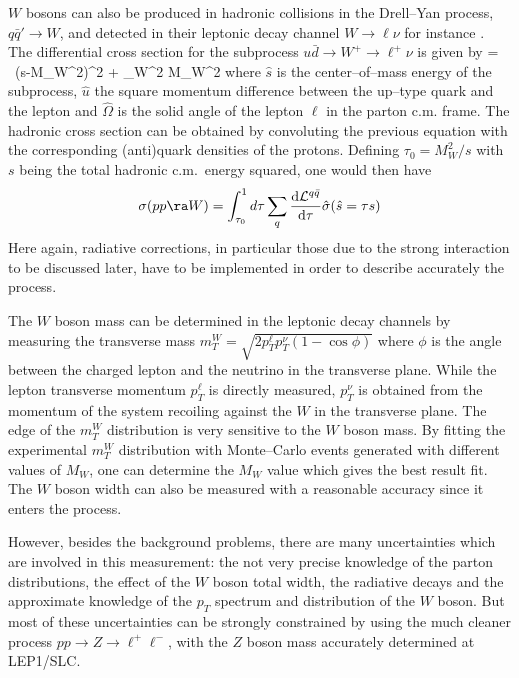 $W$ bosons can also be produced in hadronic collisions in the Drell--Yan
process, $q \bar{q}' \to W$, and detected  in their leptonic decay channel 
$W \to \ell \nu$ for instance \cite{MW-Tevatron-rev,EW-LHC}. The differential 
cross section for the subprocess $u \bar{d} \to W^+ \to \ell^+ \nu$ is  given by
\cite{Drell-Yan}
\beq
{} =
 \,  \, 
{ (\hat s-M_W^2)^2 + \Gamma_W^2 M_W^2} 
\eeq
where   $\hat{s}$ is the center--of--mass energy of the subprocess, $\hat{u}$
the square momentum difference between the up--type quark and the lepton 
and $\hat{\Omega}$ is the solid angle of the lepton $\ell$ in the parton
c.m. frame. The hadronic cross section can be obtained by convoluting the 
previous equation with the corresponding (anti)quark densities of the protons.  
Defining $\tau_0=M_W^2/s$  with $s$ being the total hadronic c.m.~energy 
squared, one would then have
\begin{eqnarray}
\sigma (pp \ra W) = \int_{\tau_0}^1 d\tau 
\sum_q \frac{{\rm d} {\cal L}^{q\bar q}}{{\rm d} \tau} \hat\sigma (\hat{s}
=\tau s)  
\end{eqnarray}
Here again, radiative corrections, in particular those due to the strong
interaction \cite{DYNLO,DYNNLO} to be discussed later, have to be implemented 
in order to describe accurately the process. \s

The $W$ boson mass can be determined \cite{MW-Tevatron-rev,EW-LHC} in the 
leptonic decay channels by 
measuring the transverse mass $m_T^W = \sqrt{ 2 p_T^\ell p_T^\nu (1- \cos 
\phi)}$ where  $\phi$ is the angle between the charged lepton and the  neutrino
in the transverse plane. While the lepton transverse momentum $p_T^\ell$ is
directly measured,  $p_T^\nu$ is obtained from the momentum of the system
recoiling against the $W$ in the transverse plane. The edge of the $m_T^W$
distribution is very sensitive to the $W$ boson mass.   By fitting the
experimental $m_T^W$ distribution with Monte--Carlo events generated with
different values of $M_W$, one can determine the $M_W$ value  which gives the
best result fit. The $W$ boson width can also be  measured  with a reasonable
accuracy since it enters the process.\s

However, besides the background problems, there are many uncertainties which
are involved in this measurement: the not very precise knowledge of the parton
distributions, the effect of the $W$ boson total width, the radiative decays
and the approximate knowledge of the $p_T$ spectrum and distribution of the $W$
boson. But most of these uncertainties can be strongly constrained by using the
much cleaner process $pp \to Z \to \ell^+ \ell^-$, with the $Z$ boson mass
accurately determined at LEP1/SLC. 

